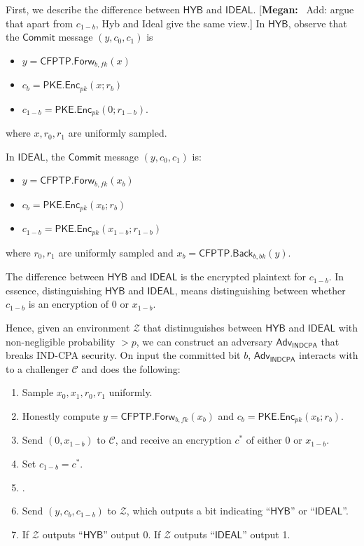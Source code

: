 \documentclass{article}[12pt]
\newcommand{\authnote}[2]{[{\color{red}\textbf{#1:}}~{\color{blue} #2}]}
\newcommand{\authnote}[2]{}
\newcommand{\megan}[1]{\authnote{Megan}{#1}}
\newcommand{\OpenMsg}{\mathsf{Open}}
\newcommand{\CommitMsg}{\mathsf{Commit}}
\newcommand{\PKE}{\mathsf{PKE}}
\newcommand{\Enc}{\mathsf{Enc}}
\newcommand{\Indcpa}{\mathsf{INDCPA}}
\newcommand{\IndcpaGM}{\mathcal{C}} %
\newcommand{\EncKey}{{pk}}
\newcommand{\CFPTP}{\mathsf{CFPTP}}
\newcommand{\Forw}{\mathsf{Forw}}
\newcommand{\Back}{\mathsf{Back}}
\newcommand{\ForwKey}{{fk}}
\newcommand{\BackKey}{{bk}}
\newcommand{\Adversary}{{\mathsf{Adv}}} %
\newcommand{\Environment}{{\mathcal{Z}}} %
\newcommand{\IndcpaAdversary}{{\Adversary_\Indcpa}}
\newcommand{\Ideal}{{\mathsf{IDEAL}}}
\newcommand{\Hyb}{{\mathsf{HYB}}}
\begin{document}
First, we describe the difference between $\Hyb$ and $\Ideal$. \megan{Add: argue that apart from $c_{1-b}$, Hyb and Ideal give the same view.}
In $\Hyb$, observe that the $\CommitMsg$ message $(y, c_0, c_1)$ is
\begin{itemize}
	\item $y = \CFPTP.\Forw_{b, \ForwKey}(x)$
	\item $c_b = \PKE.\Enc_\EncKey(x; r_b)$
	\item $c_{1-b} = \PKE.\Enc_\EncKey(0; r_{1-b})$.
\end{itemize}
where $x, r_0, r_1$ are uniformly sampled.

In $\Ideal$, the $\CommitMsg$ message $(y, c_0, c_1)$ is:
\begin{itemize}
	\item $y = \CFPTP.\Forw_{b, \ForwKey}(x_b)$
	\item $c_b = \PKE.\Enc_\EncKey(x_b; r_b)$
	\item $c_{1-b} = \PKE.\Enc_\EncKey(x_{1-b}; r_{1-b})$
\end{itemize}
where $r_0, r_1$ are uniformly sampled and $x_b = \CFPTP.\Back_{b, \BackKey}(y)$.

The difference between $\Hyb$ and $\Ideal$ is the encrypted plaintext for $c_{1-b}$. In essence, distinguishing $\Hyb$ and $\Ideal$, means distinguishing between whether $c_{1-b}$ is an encryption of $0$ or $x_{1-b}$.

Hence, given an environment $\Environment$ that distinuguishes between $\Hyb$ and $\Ideal$ with non-negligible probability $>p$, we can construct an adversary $\IndcpaAdversary$ that breaks IND-CPA security. On input the committed bit $b$, $\IndcpaAdversary$ interacts with to a challenger $\IndcpaGM$ and does the following:
\begin{enumerate}
	\item Sample $x_0, x_1, r_0, r_1$ uniformly.
	\item Honestly compute $y = \CFPTP.\Forw_{b, \ForwKey}(x_b)$ and $c_b = \PKE.\Enc_\EncKey(x_b; r_b)$.
	\item Send $(0, x_{1-b})$ to $\IndcpaGM$, and receive an encryption $c^*$ of either $0$ or $x_{1-b}$.
	\item Set $c_{1-b} = c^*$.
	\item \megan{Generate the rest of $\Environment$'s view (incl. $\OpenMsg$ message)}.
	\item Send $(y, c_b, c_{1-b})$ to $\Environment$, which outputs a bit indicating ``$\Hyb$'' or ``$\Ideal$''.
	\item If $\Environment$ outputs ``$\Hyb$'' output 0. If $\Environment$ outputs ``$\Ideal$'' output 1.
\end{enumerate}
\end{document}
